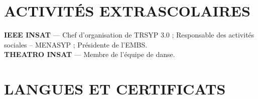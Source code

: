 \documentclass[10pt]{article}
\begin{document}
\section{ACTIVITÉS EXTRASCOLAIRES}
\textbf{IEEE INSAT} — Chef d'organisation de TRSYP 3.0 ; Responsable des activités sociales – MENASYP ; Présidente de l'EMBS.\\
\textbf{THEATRO INSAT} — Membre de l'équipe de danse.\par

\section{LANGUES ET CERTIFICATS}
\end{document}
